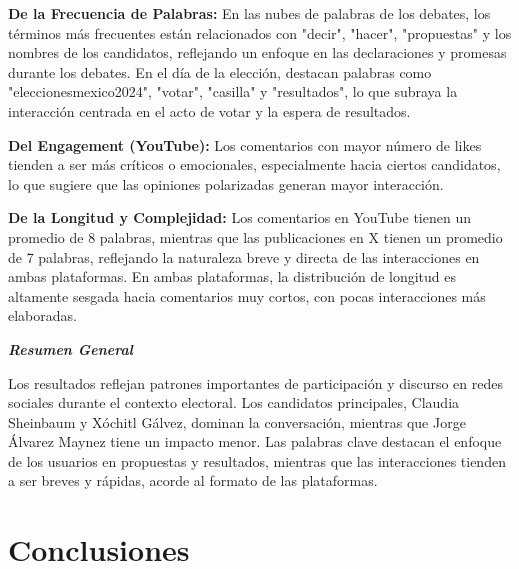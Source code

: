 \documentclass[10pt, a4paper]{article}
\begin{document}
	\textbf{De la Frecuencia de Palabras:} En las nubes de palabras de los debates, los términos más frecuentes están relacionados con "decir", "hacer", "propuestas" y los nombres de los candidatos, reflejando un enfoque en las declaraciones y promesas durante los debates. En el día de la elección, destacan palabras como "eleccionesmexico2024", "votar", "casilla" y "resultados", lo que subraya la interacción centrada en el acto de votar y la espera de resultados.
	
	\textbf{Del Engagement (YouTube):} Los comentarios con mayor número de likes tienden a ser más críticos o emocionales, especialmente hacia ciertos candidatos, lo que sugiere que las opiniones polarizadas generan mayor interacción.
	
	\textbf{De la Longitud y Complejidad:} Los comentarios en YouTube tienen un promedio de 8 palabras, mientras que las publicaciones en X tienen un promedio de 7 palabras, reflejando la naturaleza breve y directa de las interacciones en ambas plataformas. En ambas plataformas, la distribución de longitud es altamente sesgada hacia comentarios muy cortos, con pocas interacciones más elaboradas.
	
	\textbf{\textit{Resumen General}}
	
	Los resultados reflejan patrones importantes de participación y discurso en redes sociales durante el contexto electoral. Los candidatos principales, Claudia Sheinbaum y Xóchitl Gálvez, dominan la conversación, mientras que Jorge Álvarez Maynez tiene un impacto menor. Las palabras clave destacan el enfoque de los usuarios en propuestas y resultados, mientras que las interacciones tienden a ser breves y rápidas, acorde al formato de las plataformas.
	
	
	\section{Conclusiones}
	
	
	
	
	
	\printbibliography
	
	
	
\end{document}
